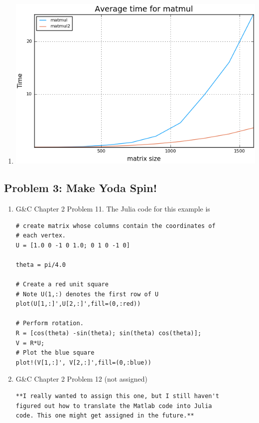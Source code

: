 \documentclass[]{article}
\begin{document}
\begin{enumerate}
\item
\hfill \break
\includegraphics[width=\textwidth,keepaspectratio]{problem2partD.png}

\end{enumerate}

\subsection{Problem 3: Make Yoda Spin!}\label{problem-3-make-yoda-spin}

\begin{enumerate}
\def\labelenumi{\arabic{enumi}.}
\item
  G\&C Chapter 2 Problem 11. The Julia code for this example is

\begin{verbatim}
# create matrix whose columns contain the coordinates of
# each vertex.
U = [1.0 0 -1 0 1.0; 0 1 0 -1 0]

theta = pi/4.0

# Create a red unit square
# Note U(1,:) denotes the first row of U
plot(U[1,:]',U[2,:]',fill=(0,:red))

# Perform rotation.
R = [cos(theta) -sin(theta); sin(theta) cos(theta)];
V = R*U;
# Plot the blue square
plot!(V[1,:]', V[2,:]',fill=(0,:blue))
\end{verbatim}
\item
  G\&C Chapter 2 Problem 12 (not assigned)

\begin{verbatim}
**I really wanted to assign this one, but I still haven't 
figured out how to translate the Matlab code into Julia
code. This one might get assigned in the future.**
\end{verbatim}
\end{enumerate}
\end{document}
